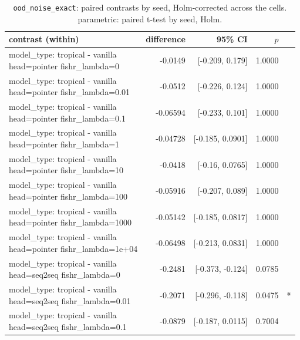 \documentclass[10pt]{article}
\makeatletter
\newcommand{\stackcell}[1]{\begin{tabular}[t]{@{}l@{}}#1\end{tabular}}
\makeatother
\begin{document}
{\small
\begin{longtable}{lrrrl}
\caption{\texttt{ood\_noise\_exact}: paired contrasts by seed, Holm-corrected across the cells. parametric: paired t-test by seed, Holm.}\label{tab:paired-ood_noise_exact}\\
\toprule
contrast (within) & difference & 95\% CI & $p$ & \\
\midrule
\endhead
\stackcell{model\_type: tropical - vanilla\\\footnotesize head=pointer fishr\_lambda=0 } & -0.0149 & [-0.209, 0.179] & 1.0000 & \\
\stackcell{model\_type: tropical - vanilla\\\footnotesize head=pointer fishr\_lambda=0.01 } & -0.0512 & [-0.226, 0.124] & 1.0000 & \\
\stackcell{model\_type: tropical - vanilla\\\footnotesize head=pointer fishr\_lambda=0.1 } & -0.06594 & [-0.233, 0.101] & 1.0000 & \\
\stackcell{model\_type: tropical - vanilla\\\footnotesize head=pointer fishr\_lambda=1 } & -0.04728 & [-0.185, 0.0901] & 1.0000 & \\
\stackcell{model\_type: tropical - vanilla\\\footnotesize head=pointer fishr\_lambda=10 } & -0.0418 & [-0.16, 0.0765] & 1.0000 & \\
\stackcell{model\_type: tropical - vanilla\\\footnotesize head=pointer fishr\_lambda=100 } & -0.05916 & [-0.207, 0.089] & 1.0000 & \\
\stackcell{model\_type: tropical - vanilla\\\footnotesize head=pointer fishr\_lambda=1000 } & -0.05142 & [-0.185, 0.0817] & 1.0000 & \\
\stackcell{model\_type: tropical - vanilla\\\footnotesize head=pointer fishr\_lambda=1e+04 } & -0.06498 & [-0.213, 0.0831] & 1.0000 & \\
\stackcell{model\_type: tropical - vanilla\\\footnotesize head=seq2seq fishr\_lambda=0 } & -0.2481 & [-0.373, -0.124] & 0.0785 & \\
\stackcell{model\_type: tropical - vanilla\\\footnotesize head=seq2seq fishr\_lambda=0.01 } & -0.2071 & [-0.296, -0.118] & 0.0475 & *\\
\stackcell{model\_type: tropical - vanilla\\\footnotesize head=seq2seq fishr\_lambda=0.1 } & -0.0879 & [-0.187, 0.0115] & 0.7004 & \\

\end{longtable}}
\end{document}

